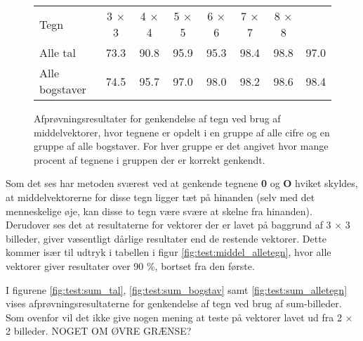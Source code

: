 \begin{figure}[htp]
\centering
\begin{tabular}{|l|c|c|c|c|c|c|c|}\hline
\rowcolor[gray]{0.9} \multicolumn{8}{|>{\columncolor[gray]{0.9}}c|}{\textbf{Middelvektor}} \\ \hline
Tegn & 3 $\times$ 3 & 4 $\times$ 4 & 5 $\times$ 5 & 6 $\times$ 6 & 7 $\times$ 7 & 8 $\times$ 8\\\hline
Alle tal & 73.3 & 90.8 & 95.9 & 95.3 & 98.4 & 98.8 & 97.0\\\hline
Alle bogstaver & 74.5 & 95.7 & 97.0 & 98.0 & 98.2 & 98.6 & 98.4\\\hline
\end{tabular}
\caption{Afprøvningsresultater for genkendelse af tegn ved brug af middelvektorer, hvor tegnene er opdelt i en gruppe af alle cifre og en gruppe af alle bogstaver. For hver gruppe er det angivet hvor mange procent af tegnene i gruppen der er korrekt genkendt.}
\label{fig:test:middel_alletegn}
\end{figure}

Som det ses har metoden sværest ved at genkende tegnene \textbf{0} og \textbf{O} hviket skyldes, at middelvektorerne for disse tegn ligger tæt på hinanden (selv med det menneskelige øje, kan disse to tegn være svære at skelne fra hinanden). Derudover ses det at resultaterne for vektorer der er lavet på baggrund af 3 $\times$ 3 billeder, giver væsentligt dårlige resultater end de restende vektorer. Dette kommer især til udtryk i tabellen i figur \vref{fig:test:middel_alletegn}, hvor alle vektorer giver resultater over 90 \%, bortset fra den første.

I figurene \vref{fig:test:sum_tal}, \vref{fig:test:sum_bogstav} samt \vref{fig:test:sum_alletegn} vises afprøvningsresultaterne for genkendelse af tegn ved brug af sum-billeder. Som ovenfor vil det ikke give nogen mening at teste på vektorer lavet ud fra 2 $\times$ 2 billeder. NOGET OM ØVRE GRÆNSE?

